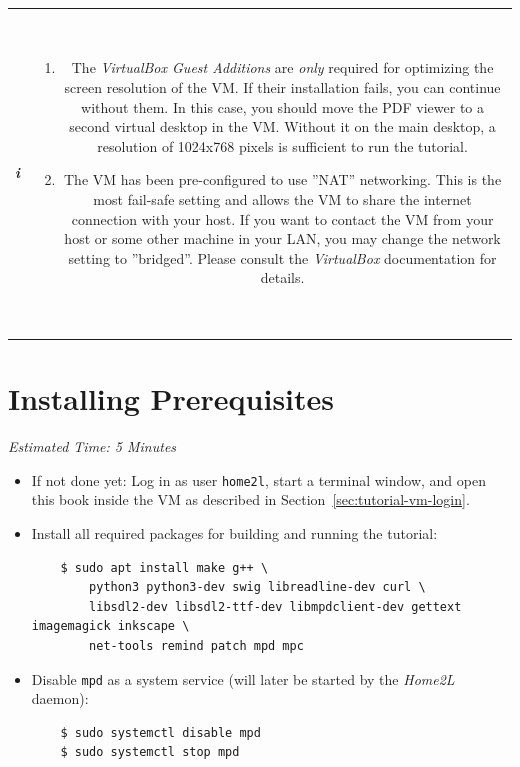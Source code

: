 \documentclass[12pt,english,parskip=half]{scrreprt}
\newcommand{\infobox}[1]{
  \hfill
  \setlength\arrayrulewidth{1pt}
  \begin{tabular}[t]{c|c|}
    \parbox{1.8em}{\hfill\textit{\Huge\textbf{i}\,}}
    &
    \,\parbox{0.89\linewidth}{\setlength{\parskip}{0.5em}#1}\,
  \end{tabular}
  \par
}
\begin{document}
\infobox{
  \begin{enumerate}

  \item
    The \emph{VirtualBox Guest Additions} are \emph{only} required for optimizing the screen
    resolution of the VM. If their installation fails, you can continue without them.
    In this case, you should move the PDF viewer to a second virtual desktop in the VM.
    Without it on the main desktop, a resolution of 1024x768 pixels is sufficient to run the tutorial.

  \item
    The VM has been pre-configured to use ''NAT'' networking. This is the most fail-safe setting and
    allows the VM to share the internet connection with your host. If you want to contact the VM from
    your host or some other machine in your LAN, you may change the network setting to ''bridged''.
    Please consult the \textit{VirtualBox} documentation for details.

  \end{enumerate}
}





\section{Installing Prerequisites}
\label{sec:tutorial-prerequisites}


\emph{Estimated Time: 5 Minutes}


\begin{itemize}[$\blacktriangleright$]

\item
  If not done yet: Log in as user \texttt{home2l}, start a terminal window,
  and open this book inside the VM as described in Section~\ref{sec:tutorial-vm-login}.

\item
  Install all required packages for building and running the tutorial:
  \begin{lstlisting}
    $ sudo apt install make g++ \
        python3 python3-dev swig libreadline-dev curl \
        libsdl2-dev libsdl2-ttf-dev libmpdclient-dev gettext imagemagick inkscape \
        net-tools remind patch mpd mpc
  \end{lstlisting}

\item
  Disable \texttt{mpd} as a system service (will later be started by the \emph{Home2L} daemon):
  \begin{lstlisting}
    $ sudo systemctl disable mpd
    $ sudo systemctl stop mpd
  \end{lstlisting}

\end{itemize}
\end{document}
